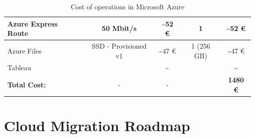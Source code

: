 \documentclass{llncs}
\begin{document}
\begin{table}[htbp]
\begin{tabular}{|l|c|c|c|c|}
        \hline
        Azure Express Route          & 50 Mbit/s             & \textasciitilde 52 €                 & 1                 & \textasciitilde 52 €                \\
        \hline
        Azure Files                  & SSD - Provisioned v1  & \textasciitilde 47 €                 & 1 (256 GB)        & \textasciitilde 47 €                \\
        \hline
        Tableau                      &                       & \textasciitilde                      &                   & \textasciitilde                     \\
        \hline
        \textbf{Total Cost:}         & -                     & -                                    &                   & \textbf{1480  €}                    \\
        \hline
    \end{tabular}
    \caption{Cost of operations in Microsoft Azure}
    \label{tab:Cost_Operation_Monthly}
\end{table}


\section{Cloud Migration Roadmap}
\end{document}
